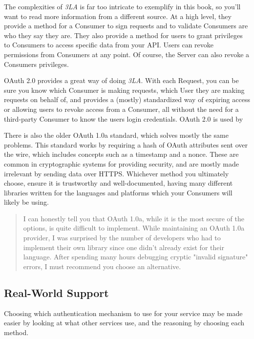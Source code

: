 \documentclass{book}
\begin{document}
The complexities of \emph{3LA} is far too intricate to exemplify in this book, so you'll want to read more information from a different source. At a high level, they provide a method for a Consumer to sign requests and to validate Consumers are who they say they are. They also provide a method for users to grant privileges to Consumers to access specific data from your API. Users can revoke permissions from Consumers at any point. Of course, the Server can also revoke a Consumers privileges.

OAuth 2.0 \cite{RFC6749} provides a great way of doing \emph{3LA}. With each Request, you can be sure you know which Consumer is making requests, which User they are making requests on behalf of, and provides a (mostly) standardized way of expiring access or allowing users to revoke access from a Consumer, all without the need for a third-party Consumer to know the users login credentials. OAuth 2.0 is used by 

There is also the older OAuth 1.0a \cite{RFC5849} standard, which solves mostly the same problems. This standard works by requiring a hash of OAuth attributes sent over the wire, which includes concepts such as a timestamp and a nonce. These are common in cryptographic systems for providing security, and are mostly made irrelevant by sending data over HTTPS. Whichever method you ultimately choose, ensure it is trustworthy and well-documented, having many different libraries written for the languages and platforms which your Consumers will likely be using.

\begin{quote}
I can honestly tell you that OAuth 1.0a, while it is the most secure of the options, is quite difficult to implement. While maintaining an OAuth 1.0a provider, I was surprised by the number of developers who had to implement their own library since one didn't already exist for their language. After spending many hours debugging cryptic "invalid signature" errors, I must recommend you choose an alternative.
\end{quote}

\subsection{Real-World Support}

Choosing which authentication mechanism to use for your service may be made easier by looking at what other services use, and the reasoning by choosing each method.
\end{document}
